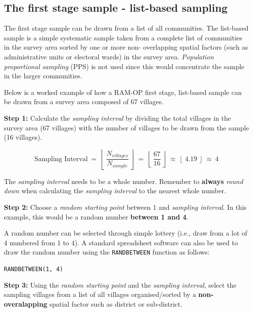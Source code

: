 \documentclass[12pt,a4paper]{book}
\theoremstyle{definition}
\theoremstyle{definition}
\theoremstyle{definition}
\theoremstyle{remark}
\begin{document}
\hypertarget{the-first-stage-sample---list-based-sampling}{%
\subsection{The first stage sample - list-based
sampling}\label{the-first-stage-sample---list-based-sampling}}

The first stage sample can be drawn from a list of all communities. The
list-based sample is a simple systematic sample taken from a complete
list of communities in the survey area sorted by one or more non-
overlapping spatial factors (such as administrative units or electoral
wards) in the survey area. \emph{Population proportional sampling} (PPS)
is not used since this would concentrate the sample in the larger
communities.

Below is a worked example of how a RAM-OP first stage, list-based sample
can be drawn from a survey area composed of 67 villages.

\textbf{Step 1:} Calculate the \emph{sampling interval} by dividing the
total villages in the survey area (67 villages) with the number of
villages to be drawn from the sample (16 villages).

\[ \text{Sampling Interval} ~ = ~ \left \lfloor ~ \frac{N_{villages}}{N_{sample}} ~ \right \rfloor ~ = ~ \left \lfloor ~ \frac{67}{16} ~ \right \rfloor ~ \approx ~ \left \lfloor ~ 4.19 ~ \right \rfloor ~ \approx ~ 4 \]

The \emph{sampling interval} needs to be a whole number. Remember to
\textbf{always} \emph{round down} when calculating the \emph{sampling
interval} to the nearest whole number.

\textbf{Step 2:} Choose a \emph{random starting point} between 1 and
\emph{sampling interval}. In this example, this would be a random number
\textbf{between 1 and 4}.

A random number can be selected through simple lottery (i.e., draw from
a lot of 4 numbered from 1 to 4). A standard spreadsheet software can
also be used to draw the random number using the \texttt{RANDBETWEEN}
function as follows:

\texttt{RANDBETWEEN(1,\ 4)}

\textbf{Step 3:} Using the \emph{random starting point} and the
\emph{sampling interval}, select the sampling villages from a list of
all villages organised/sorted by a \textbf{non-overalapping} spatial
factor such as district or sub-district.
\end{document}
